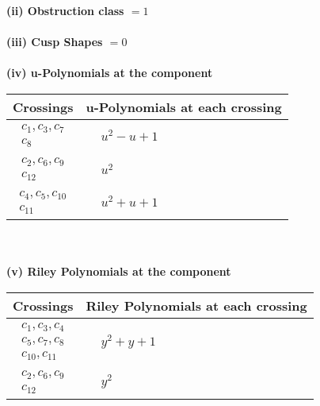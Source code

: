 \documentclass[1p]{elsarticle_modified}
\theoremstyle{definition}
\begin{document}
\flushleft \textbf{(ii) Obstruction class $= 1$}\\~\\
\flushleft \textbf{(iii) Cusp Shapes $= 0$}\\~\\
\newpage\renewcommand{\arraystretch}{1}
\flushleft \textbf{(iv) u-Polynomials at the component}\newline \\
\begin{tabular}{m{50pt}|m{274pt}}
Crossings & \hspace{64pt}u-Polynomials at each crossing \\
\hline $$\begin{aligned}c_{1},c_{3},c_{7}\\c_{8}\end{aligned}$$&$\begin{aligned}
&u^2- u+1
\end{aligned}$\\
\hline $$\begin{aligned}c_{2},c_{6},c_{9}\\c_{12}\end{aligned}$$&$\begin{aligned}
&u^2
\end{aligned}$\\
\hline $$\begin{aligned}c_{4},c_{5},c_{10}\\c_{11}\end{aligned}$$&$\begin{aligned}
&u^2+u+1
\end{aligned}$\\
\hline
\end{tabular}\\~\\
\newpage\renewcommand{\arraystretch}{1}
\flushleft \textbf{(v) Riley Polynomials at the component}\newline \\
\begin{tabular}{m{50pt}|m{274pt}}
Crossings & \hspace{64pt}Riley Polynomials at each crossing \\
\hline $$\begin{aligned}c_{1},c_{3},c_{4}\\c_{5},c_{7},c_{8}\\c_{10},c_{11}\end{aligned}$$&$\begin{aligned}
&y^2+y+1
\end{aligned}$\\
\hline $$\begin{aligned}c_{2},c_{6},c_{9}\\c_{12}\end{aligned}$$&$\begin{aligned}
&y^2
\end{aligned}$\\
\hline
\end{tabular}\\~\\
\end{document}
